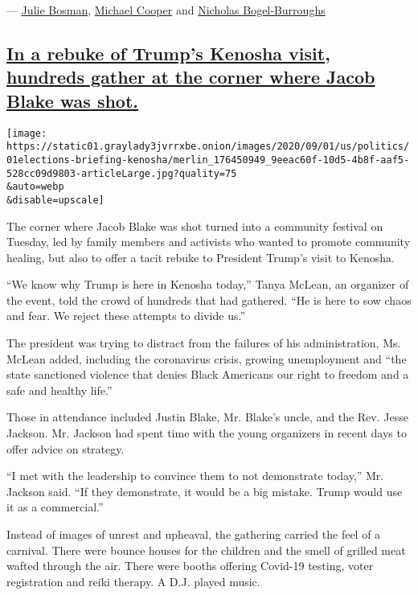 --- \href{https://www.nytimes3xbfgragh.onion/by/julie-bosman}{Julie
Bosman},
\href{https://www.nytimes3xbfgragh.onion/by/michael-cooper}{Michael
Cooper} and
\href{https://www.nytimes3xbfgragh.onion/by/nicholas-bogel-burroughs}{Nicholas
Bogel-Burroughs}

\hypertarget{in-a-rebuke-of-trumps-kenosha-visit-hundreds-gather-at-the-corner-where-jacob-blake-was-shot}{%
\subsection{\texorpdfstring{\protect\hyperlink{in-a-rebuke-of-trumps-kenosha-visit-hundreds-gather-at-the-corner-where-jacob-blake-was-shot}{In
a rebuke of Trump's Kenosha visit, hundreds gather at the corner where
Jacob Blake was
shot.}}{In a rebuke of Trump's Kenosha visit, hundreds gather at the corner where Jacob Blake was shot.}}\label{in-a-rebuke-of-trumps-kenosha-visit-hundreds-gather-at-the-corner-where-jacob-blake-was-shot}}

\texttt{[image: https://static01.graylady3jvrrxbe.onion/images/2020/09/01/us/politics/01elections-briefing-kenosha/merlin\_176450949\_9eeac60f-10d5-4b8f-aaf5-528cc09d9803-articleLarge.jpg?quality=75\\\&auto=webp\\\&disable=upscale]}

The corner where Jacob Blake was shot turned into a community festival
on Tuesday, led by family members and activists who wanted to promote
community healing, but also to offer a tacit rebuke to President Trump's
visit to Kenosha.

``We know why Trump is here in Kenosha today,'' Tanya McLean, an
organizer of the event, told the crowd of hundreds that had gathered.
``He is here to sow chaos and fear. We reject these attempts to divide
us.''

The president was trying to distract from the failures of his
administration, Ms. McLean added, including the coronavirus crisis,
growing unemployment and ``the state sanctioned violence that denies
Black Americans our right to freedom and a safe and healthy life.''

Those in attendance included Justin Blake, Mr. Blake's uncle, and the
Rev. Jesse Jackson. Mr. Jackson had spent time with the young organizers
in recent days to offer advice on strategy.

``I met with the leadership to convince them to not demonstrate today,''
Mr. Jackson said. ``If they demonstrate, it would be a big mistake.
Trump would use it as a commercial.''

Instead of images of unrest and upheaval, the gathering carried the feel
of a carnival. There were bounce houses for the children and the smell
of grilled meat wafted through the air. There were booths offering
Covid-19 testing, voter registration and reiki therapy. A D.J. played
music.

